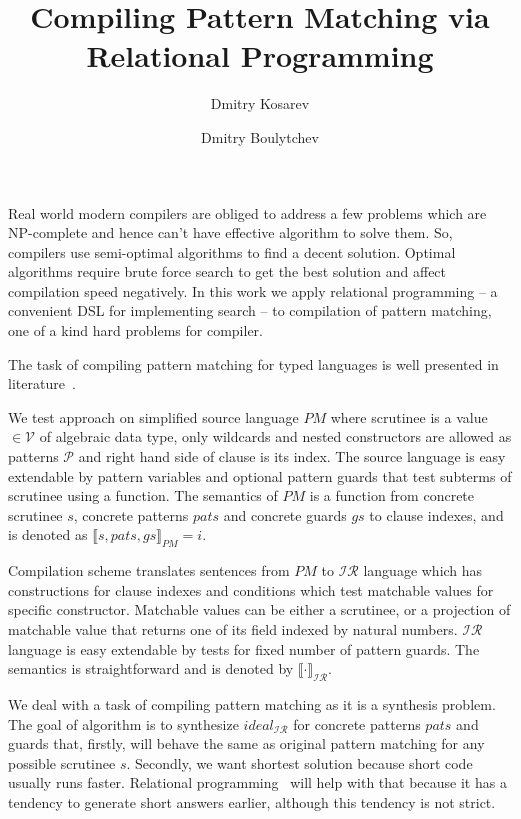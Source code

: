 \documentclass[submission,copyright,creativecommons]{eptcs}
\title{Compiling Pattern Matching via Relational Programming}
\author{Dmitry Kosarev
\institute{Saint Petersburg State University and \\ JetBrains Research, Russia}
\email{Dmitrii.Kosarev@protonmail.ch}
\and
Dmitry Boulytchev
\institute{Saint Petersburg State University and \\ JetBrains Research, Russia}
\email{dboulytchev@math.spbu.ru}
}
\newcommand{\sem}[1]{\llbracket #1 \rrbracket}
\newcommand{\ir}{\ensuremath{\mathcal{I\!R}}}
\begin{document}
\maketitle

Real world modern compilers are obliged to address a few problems which are NP-complete and hence can't have effective  algorithm to solve them. So, compilers use semi-optimal algorithms to find a decent solution. Optimal algorithms require brute force search to get the best solution and  affect compilation speed negatively. In this work we apply relational programming -- a convenient DSL for implementing search -- to compilation of pattern matching, one of a kind hard problems for compiler.

The task of compiling pattern matching for typed languages is well presented in literature~\cite{maranget2001,maranget2008}.




We test approach on simplified source language $PM$ where scrutinee is a value $\in\mathcal{V}$ of algebraic data type, only wildcards and nested constructors are allowed as patterns $\mathcal{P}$ and right hand side of clause is its index. The source language is easy extendable by pattern variables and optional pattern guards that test subterms of scrutinee using a function. The semantics of $PM$ is a function from concrete scrutinee $s$, concrete patterns $pats$ and concrete guards $gs$ to clause indexes, and is denoted as $\sem{s,pats,gs}_{PM} = i$.

Compilation scheme translates sentences from $PM$ to $\ir$ language which has constructions for clause indexes and conditions which test matchable values for specific constructor. Matchable values can be either a scrutinee, or a projection of matchable value that returns one of its field indexed by natural numbers. $\ir$ language is easy extendable by tests for fixed number of pattern guards. The semantics is straightforward and is denoted by $\sem{\cdot}_{\ir}$.

We deal with a task of compiling pattern matching as it is a synthesis problem. The goal of algorithm is to synthesize $ideal_\ir$ for concrete patterns $pats$ and guards that, firstly, will behave the same as original pattern matching for any possible scrutinee $s$. Secondly, we want shortest solution because short code usually runs faster. Relational programming~\cite{OCanren} will help with that because it has a tendency to generate short answers earlier, although this tendency is not strict.
\end{document}
